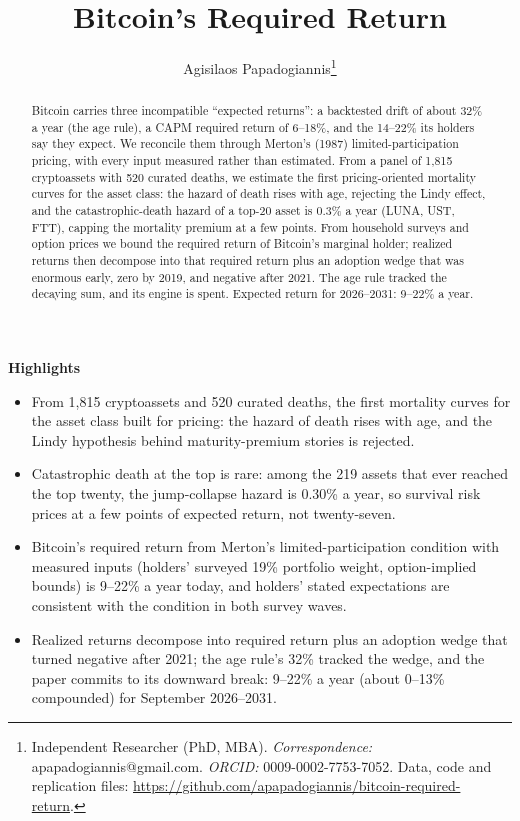 \documentclass[11pt]{article}
\title{Bitcoin's Required Return}
\author{Agisilaos Papadogiannis\thanks{Independent Researcher (PhD, MBA). \emph{Correspondence:} apapadogiannis@gmail.com. \emph{ORCID:} 0009-0002-7753-7052. Data, code and replication files: \url{https://github.com/apapadogiannis/bitcoin-required-return}.}}
\date{}
\begin{document}
\maketitle

\begin{abstract}
\noindent Bitcoin carries three incompatible ``expected returns'': a backtested drift of about 32\% a year (the age rule), a CAPM required return of 6--18\%, and the 14--22\% its holders say they expect. We reconcile them through Merton's (1987) limited-participation pricing, with every input measured rather than estimated. From a panel of 1,815 cryptoassets with 520 curated deaths, we estimate the first pricing-oriented mortality curves for the asset class: the hazard of death rises with age, rejecting the Lindy effect, and the catastrophic-death hazard of a top-20 asset is 0.3\% a year (LUNA, UST, FTT), capping the mortality premium at a few points. From household surveys and option prices we bound the required return of Bitcoin's marginal holder; realized returns then decompose into that required return plus an adoption wedge that was enormous early, zero by 2019, and negative after 2021. The age rule tracked the decaying sum, and its engine is spent. Expected return for 2026--2031: 9--22\% a year.
\end{abstract}

\medskip\noindent\textbf{\large Highlights}\par\nopagebreak
\begin{itemize}
\item From 1,815 cryptoassets and 520 curated deaths, the first mortality curves for the asset class built for pricing: the hazard of death rises with age, and the Lindy hypothesis behind maturity-premium stories is rejected.
\item Catastrophic death at the top is rare: among the 219 assets that ever reached the top twenty, the jump-collapse hazard is 0.30\% a year, so survival risk prices at a few points of expected return, not twenty-seven.
\item Bitcoin's required return from Merton's limited-participation condition with measured inputs (holders' surveyed 19\% portfolio weight, option-implied bounds) is 9--22\% a year today, and holders' stated expectations are consistent with the condition in both survey waves.
\item Realized returns decompose into required return plus an adoption wedge that turned negative after 2021; the age rule's 32\% tracked the wedge, and the paper commits to its downward break: 9--22\% a year (about 0--13\% compounded) for September 2026--2031.
\end{itemize}
\end{document}
